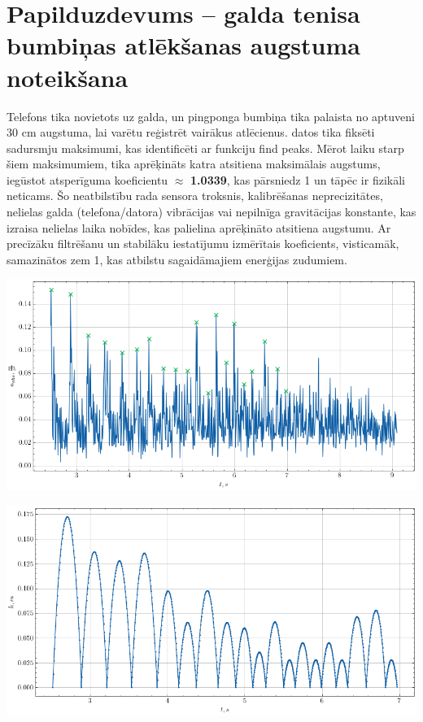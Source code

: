\documentclass[12pt]{article}
\begin{document}
\section*{Papilduzdevums – galda tenisa bumbiņas atlēkšanas augstuma noteikšana}

Telefons tika novietots uz galda, un pingponga bumbiņa tika palaista no aptuveni 30 cm augstuma, lai varētu reģistrēt vairākus atlēcienus.  datos tika fiksēti sadursmju maksimumi, kas identificēti ar funkciju find peaks. Mērot laiku starp šiem maksimumiem, tika aprēķināts katra atsitiena maksimālais augstums, iegūstot atsperīguma koeficientu $\approx$ \textbf{1.0339}, kas pārsniedz 1 un tāpēc ir fizikāli neticams. Šo neatbilstību rada sensora troksnis, kalibrēšanas neprecizitātes, nelielas galda (telefona/datora) vibrācijas vai nepilnīga gravitācijas konstante, kas izraisa nelielas laika nobīdes, kas palielina aprēķināto atsitiena augstumu. Ar precīzāku filtrēšanu un stabilāku iestatījumu izmērītais koeficients, visticamāk, samazinātos zem 1, kas atbilstu sagaidāmajiem enerģijas zudumiem.

\begin{center}
    \includegraphics[width=1\textwidth]{Papilduzdevums – galda tenisa bumbiņas atlēkšanas augstuma noteikšana1.png}
\end{center}


\begin{center}
    \includegraphics[width=1\textwidth]{Papilduzdevums – galda tenisa bumbiņas atlēkšanas augstuma noteikšana2.png}
\end{center}
\end{document}
